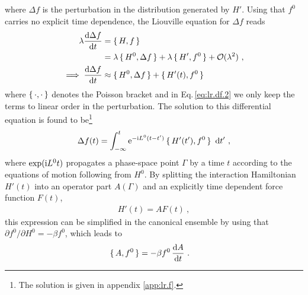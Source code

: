 where $\Delta f$ is the perturbation in the distribution generated by $H'$. Using that $f^0$ carries no explicit time dependence, the Liouville equation for $\Delta f$ reads
\begin{align}
  \lambda \frac{\d \Delta f}{\d t}
    &= \set{H, f} \nonumber \\
    &= \lambda \set{H^0, \Delta f} 
      + \lambda \set{H', f^0}
      + \mathcal{O}(\lambda^2)~,
  \label{eq:lr.df.1} \\
  \implies
    \frac{\d \Delta f}{\d t}
      &\approx \set{H^0 , \Delta f} + \set{H' (t), f^0}
  \label{eq:lr.df.2}
\end{align}
where $\set{\cdot , \cdot}$ denotes the Poisson bracket
and in Eq.\,\eqref{eq:lr.df.2} we only keep the terms to linear order in the perturbation.
The solution to this differential equation is found to be\footnote{The solution is given in appendix \ref{app:lr.f}.}~\cite{Kubo1957a}
\begin{align}
  \Delta f (t) 
    = \int_{-\infty}^t {\rm e}^{-\im L^0 (t - t')} \set{H' (t'), f^0}~\d t'~,
  \label{eq:lr.df(t)}
\end{align}
where $\exp ({\rm i} L^0 t)$ propagates a phase-space point $\Gamma$ by a time $t$ according to the equations of motion following from $H^0$.
By splitting the interaction Hamiltonian $H'(t)$ into an operator part $A(\Gamma)$ and an explicitly time dependent force function $F(t)$,
\begin{align}
  H' (t)=AF(t)~,
\end{align}
this expression can be simplified in the canonical ensemble by using that \mbox{$\partial f^0 / \partial H^0 = -\beta f^0$}, which leads to
\begin{align*}
  \set{A, f^0}
    &= -\beta f^0 \, \frac{{\rm d} A}{{\rm d} t}~.
\end{align*}

